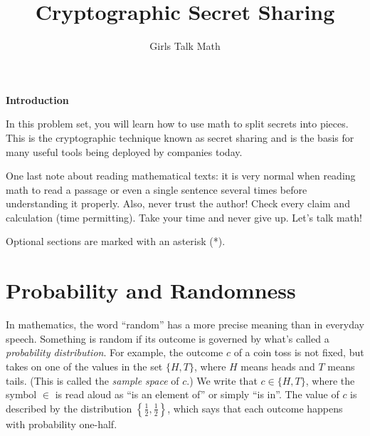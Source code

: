 \documentclass[12 pt]{article}
\title{Cryptographic Secret Sharing}
\author{Girls Talk Math}
\date{}
\newcounter{exercise}[section]
\newcounter{example}[section]
\begin{document}
\maketitle
\vskip 1in
\begin{center} \textbf{Introduction} \end{center}

\indent In this problem set, you will learn how to use math to split secrets into pieces. This is the cryptographic technique known as secret sharing and is the basis for many useful tools being deployed by companies today.

One last note about reading mathematical texts: it is very normal when reading math to read a passage or even a single sentence several times before understanding it properly. Also, never trust the author! Check every claim and calculation (time permitting). Take your time and never give up. Let's talk math!

\newpage

\tableofcontents
\vspace*{\fill}
Optional sections are marked with an asterisk (*).



\newpage


\section{Probability and Randomness}\label{sec:prob}

In mathematics, the word ``random'' has a more precise meaning than in everyday 
speech. Something is random if its outcome is governed by what's called a 
\emph{probability distribution}. 
For example, the outcome $c$ of a coin toss is not fixed, but takes 
on one of the values in the set $\{H, T\}$, where $H$ means heads and $T$ means 
tails. (This is called the \emph{sample space} of $c$.) We write 
that $c \in \{H,T\}$, where the symbol $\in$ is read aloud as 
``is an element of'' or simply ``is in''.
The value of $c$ is described by the distribution $\left\{\frac{1}{2}, 
\frac{1}{2}\right\}$, which says that each outcome happens with 
probability one-half.
\end{document}
